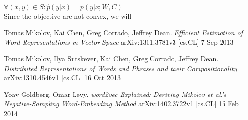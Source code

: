 \documentclass[]{article}
\begin{document}
$\forall (x,y) \in S: \hat{p}(y|x) = p(y|x; W,C)$\\

\noindent Since the objective are not convex, we will 

\begin{thebibliography}{1}
 Tomas Mikolov, Kai Chen, Greg Corrado, Jeffrey Dean. {\em Efficient Estimation of Word Representations in Vector Space} arXiv:1301.3781v3 [cs.CL] 7 Sep 2013

 Tomas Mikolov, Ilya Sutskever, Kai Chen, Greg Corrado, Jeffrey Dean. {\em Distributed Representations of Words and Phrases and their Compositionality} arXiv:1310.4546v1  [cs.CL]  16 Oct 2013

 Yoav Goldberg, Omar Levy. {\em word2vec Explained: Deriving Mikolov et al.'s Negative-Sampling Word-Embedding Method} arXiv:1402.3722v1  [cs.CL]  15 Feb 2014

\end{thebibliography}
\end{document}

